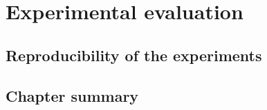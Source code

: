 \chapter{Experimental evaluation}\label{chapter:experimental_evaluation}


\section{Reproducibility of the experiments}
\label{sec:reproducibility}

\section{Chapter summary}
